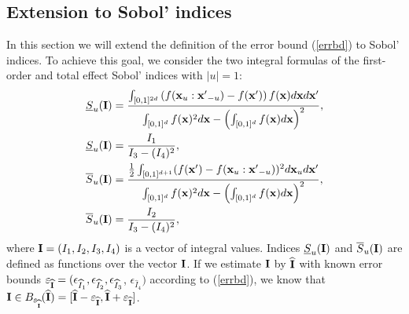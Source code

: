 \subsection{Extension to Sobol' indices}
\label{sec:3.2}
In this section we will extend the definition of the error bound (\ref{errbd}) to Sobol' indices. To achieve this goal, we consider the two integral formulas of the first-order and total effect Sobol' indices with $|u|=1$:
\begin{align*}
\underline{S}_u(\vI) & = \frac{\int_{[0,1]^{2d}} \left(f(\vx_u:{\vx'}_{-u})-f(\vx')\right)f(\vx)d\vx d{\vx'}}{\int_{[0,1]^{d}} f(\vx)^2 d{\vx}-\left(\int_{[0,1]^{d}} f(\vx) d{\vx}\right)^2}, \\ 
\underline{S}_u(\vI) & = \frac{I_1}{I_3-(I_4)^2}, \\
\overline{S}_u(\vI) & = \frac{\frac{1}{2}\int_{[0,1]^{d+1}}(f(\vx')-f(\vx_u:{\vx'}_{-u}))^2d\vx_u d{\vx'}}{\int_{[0,1]^{d}} f(\vx)^2 d{\vx}-\left(\int_{[0,1]^{d}} f(\vx) d{\vx}\right)^2}, \\
\overline{S}_u(\vI) & = \frac{I_2}{I_3-(I_4)^2},
\end{align*}
where $\vI=(I_1,I_2,I_3,I_4)$ is a vector of integral values. Indices $\underline{S}_u(\vI)$ and $\overline{S}_u(\vI)$ are defined as functions over the vector $\vI$. If we estimate $\vI$ by $\widehat{\vI}$ with known error bounds $\varepsilon_{\widehat{\vI}}=(\epsilon_{\widehat{I}_1},\epsilon_{\widehat{I}_2},\epsilon_{\widehat{I}_3}$, $\epsilon_{\widehat{I}_4})$ according to (\ref{errbd}), we know that $\vI\in B_{\varepsilon_{\widehat{\vI}}}(\widehat{\vI})=[\widehat{\vI}-\varepsilon_{\widehat{\vI}},\widehat{\vI}+\varepsilon_{\widehat{\vI}} ]$. 

